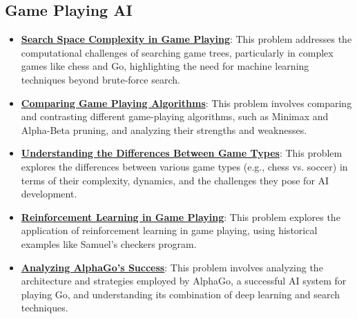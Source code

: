 \documentclass{article}%
\begin{document}
\subsection{Game Playing AI}%
\label{subsec:GamePlayingAI}%
\begin{itemize}[leftmargin=*]%
\item \href{https://purdue.brightspace.com/d2l/common/assets/pdfjs-d2l-dist/1.0.14-legacy/web/viewer.html?file=\%2Fcontent\%2Fenforced\%2F1095467-wl.202510.CS.24300.001\%2F02L2-Intro.pdf\%3Fou\%3D1095467\&lang=en-us\&container=d2l-fileviewer-rendered-pdf\&fullscreen=d2l-fileviewer-rendered-pdf-dialog\&height=667#page=11}{\textbf{Search Space Complexity in Game Playing}}: This problem addresses the computational challenges of searching game trees, particularly in complex games like chess and Go, highlighting the need for machine learning techniques beyond brute{-}force search.%
\item \href{https://purdue.brightspace.com/d2l/common/assets/pdfjs-d2l-dist/1.0.14-legacy/web/viewer.html?file=\%2Fcontent\%2Fenforced\%2F1095467-wl.202510.CS.24300.001\%2F02L2-Intro.pdf\%3Fou\%3D1095467\&lang=en-us\&container=d2l-fileviewer-rendered-pdf\&fullscreen=d2l-fileviewer-rendered-pdf-dialog\&height=667#page=22}{\textbf{Comparing Game Playing Algorithms}}: This problem involves comparing and contrasting different game{-}playing algorithms, such as Minimax and Alpha{-}Beta pruning, and analyzing their strengths and weaknesses.%
\item \href{https://purdue.brightspace.com/d2l/common/assets/pdfjs-d2l-dist/1.0.14-legacy/web/viewer.html?file=\%2Fcontent\%2Fenforced\%2F1095467-wl.202510.CS.24300.001\%2F02L2-Intro.pdf\%3Fou\%3D1095467\&lang=en-us\&container=d2l-fileviewer-rendered-pdf\&fullscreen=d2l-fileviewer-rendered-pdf-dialog\&height=667#page=27}{\textbf{Understanding the Differences Between Game Types}}: This problem explores the differences between various game types (e.g., chess vs. soccer) in terms of their complexity, dynamics, and the challenges they pose for AI development.%
\item \href{https://purdue.brightspace.com/d2l/common/assets/pdfjs-d2l-dist/1.0.14-legacy/web/viewer.html?file=\%2Fcontent\%2Fenforced\%2F1095467-wl.202510.CS.24300.001\%2F02L2-Intro.pdf\%3Fou\%3D1095467\&lang=en-us\&container=d2l-fileviewer-rendered-pdf\&fullscreen=d2l-fileviewer-rendered-pdf-dialog\&height=667#page=46}{\textbf{Reinforcement Learning in Game Playing}}: This problem explores the application of reinforcement learning in game playing, using historical examples like Samuel's checkers program.%
\item \href{https://purdue.brightspace.com/d2l/common/assets/pdfjs-d2l-dist/1.0.14-legacy/web/viewer.html?file=\%2Fcontent\%2Fenforced\%2F1095467-wl.202510.CS.24300.001\%2F02L2-Intro.pdf\%3Fou\%3D1095467\&lang=en-us\&container=d2l-fileviewer-rendered-pdf\&fullscreen=d2l-fileviewer-rendered-pdf-dialog\&height=667#page=50}{\textbf{Analyzing AlphaGo's Success}}: This problem involves analyzing the architecture and strategies employed by AlphaGo, a successful AI system for playing Go, and understanding its combination of deep learning and search techniques.%
\end{itemize}
\end{document}
